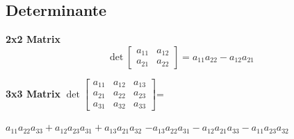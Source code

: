 \subsection{Determinante}
\begin{minipage}{9cm}
    
    	\textbf{2x2 Matrix}    
    $$ \det \begin{bmatrix} a_{11} & a_{12} \\
                            a_{21} & a_{22} \end{bmatrix} =
                            a_{11} a_{22} - a_{12} a_{21}  $$
\end{minipage}
\begin{minipage}{0.45\linewidth}
    	\textbf{3x3 Matrix}\newline
    $ \det \begin{bmatrix} a_{11} & a_{12} & a_{13} \\
    a_{21} & a_{22}& a_{23} \\
    a_{31} & a_{32} & a_{33} \end{bmatrix}
    $=\begin{minipage}{0.7\linewidth}
        $a_{11} a_{22} a_{33}
        + a_{12} a_{23} a_{31}
        + a_{13} a_{21} a_{32}$ \newline$
        - a_{13} a_{22} a_{31}
        - a_{12} a_{21} a_{33}
        - a_{11} a_{23} a_{32}  $
    \end{minipage} 
\end{minipage}	

